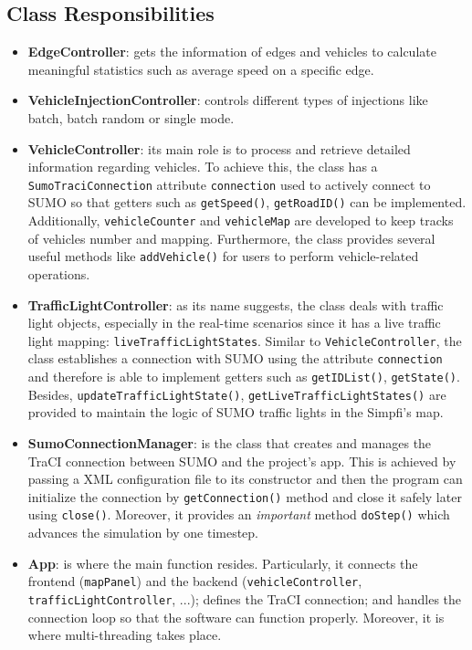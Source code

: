 \documentclass[a4paper, 12pt]{article}
\begin{document}
\subsection{Class Responsibilities}
\begin{itemize}
    \item \textbf{EdgeController}: gets the information of edges and vehicles to calculate meaningful statistics such as average speed on a specific edge.
    \item \textbf{VehicleInjectionController}: controls different types of injections like batch, batch random or single mode.
    \item \textbf{VehicleController}: its main role is to process and retrieve detailed information regarding vehicles. To achieve this, the class has a \verb|SumoTraciConnection| attribute \verb|connection| used to actively connect to SUMO so that getters such as \verb|getSpeed()|, \verb|getRoadID()| can be implemented. Additionally, \verb|vehicleCounter| and \verb|vehicleMap| are developed to keep tracks of vehicles number and mapping. Furthermore, the class provides several useful methods like \verb|addVehicle()| for users to perform vehicle-related operations.
    \item \textbf{TrafficLightController}: as its name suggests, the class deals with traffic light objects, especially in the real-time scenarios since it has a live traffic light mapping: \verb|liveTrafficLightStates|. Similar to \verb|VehicleController|, the class establishes a connection with SUMO using the attribute \verb|connection| and therefore is able to implement getters such as \verb|getIDList()|, \verb|getState()|. Besides, \verb|updateTrafficLightState()|, \verb|getLiveTrafficLightStates()| are provided to maintain the logic of SUMO traffic lights in the Simpfi's map.
    \item \textbf{SumoConnectionManager}: is the class that creates and manages the TraCI connection between SUMO and the project's app. This is achieved by passing a XML configuration file to its constructor and then the program can initialize the connection by \verb|getConnection()| method and close it safely later using \verb|close()|. Moreover, it provides an \textit{important} method \verb|doStep()| which advances the simulation by one timestep.
    \item \textbf{App}: is where the main function resides. Particularly, it connects the frontend (\verb|mapPanel|) and the backend (\verb|vehicleController|, \verb|trafficLightController|, ...); defines the TraCI connection; and handles the connection loop so that the software can function properly. Moreover, it is where multi-threading takes place.
\end{itemize}
\end{document}
